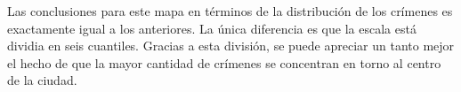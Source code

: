 \documentclass[12pt]{article}
\begin{document}
Las conclusiones para este mapa en t\'erminos de la distribuci\'on de los cr\'imenes es exactamente igual a los anteriores. La \'unica diferencia es que la escala est\'a dividia en seis cuantiles. Gracias a esta divisi\'on, se puede apreciar un tanto mejor el hecho de que la mayor cantidad de cr\'imenes se concentran en torno al centro de la ciudad. 



\end{document}
